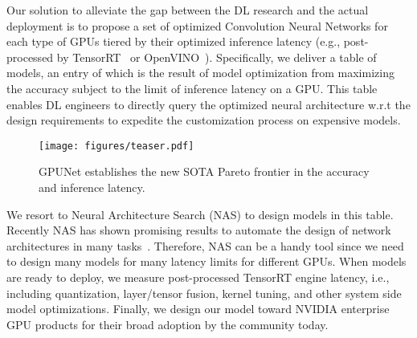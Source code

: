 \documentclass[10pt,twocolumn,letterpaper]{article}
\begin{document}
Our solution to alleviate the gap between the DL research and the actual deployment is to propose a set of optimized Convolution Neural Networks for each type of GPUs tiered by their optimized inference latency (e.g., post-processed by TensorRT~\cite{TensorRTIntro} or OpenVINO~\cite{openVINOIntro}). Specifically, we deliver a table of models, an entry of which is the result of model optimization from maximizing the accuracy subject to the limit of inference latency on a GPU. This table enables DL engineers to directly query the optimized neural architecture w.r.t the design requirements to expedite the customization process on expensive models.

\begin{figure}[t]
\centering 
  \begin{center}
    \texttt{[image: figures/teaser.pdf]}
  \end{center}
     \vspace{-0.5cm}
    \caption{GPUNet establishes the new SOTA Pareto frontier in the accuracy and inference latency.}
    \label{teaser_figure}
    \vspace{-0.2cm}
\end{figure}

We resort to Neural Architecture Search (NAS) to design models in this table. Recently NAS has shown promising results to automate the design of network architectures in many tasks~\cite{wang2019alphax, wang2021sample, liu2019auto}. Therefore, NAS can be a handy tool since we need to design many models for many latency limits for different GPUs. When models are ready to deploy, we measure post-processed TensorRT engine latency, i.e., including quantization, layer/tensor fusion, kernel tuning, and other system side model optimizations. Finally, we design our model toward NVIDIA enterprise GPU products for their broad adoption by the community today.
\end{document}
